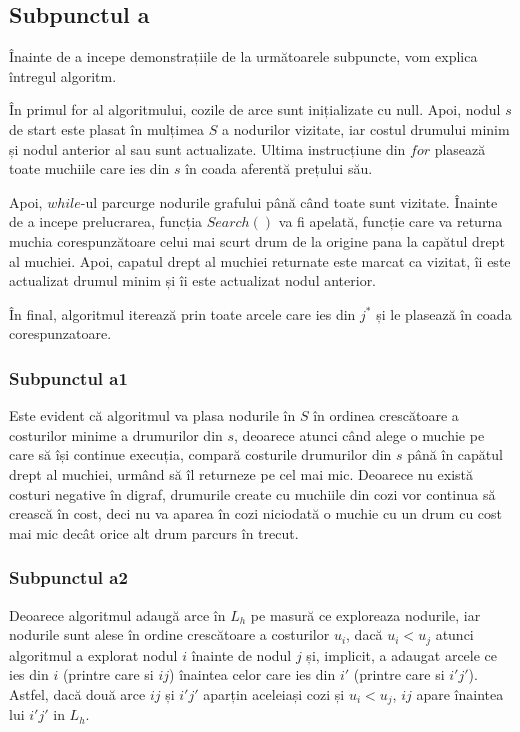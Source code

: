 \documentclass{article}
\begin{document}
\subsection*{\fontsize{16}{30}\selectfont Subpunctul a}
{\fontsize{14}{16}\selectfont
Înainte de a incepe demonstrațiile de la următoarele subpuncte, vom explica întregul algoritm.

În primul for al algoritmului, cozile de arce sunt inițializate cu null.
Apoi, nodul $s$ de start este plasat în mulțimea $S$ a nodurilor vizitate, iar costul drumului minim și nodul anterior al sau sunt actualizate. Ultima instrucțiune din $for$ plasează toate muchiile care ies din $s$ în coada aferentă prețului său.

Apoi, $while$-ul parcurge nodurile grafului până când toate sunt vizitate. Înainte de a incepe prelucrarea, funcția $Search()$ va fi apelată, funcție care va returna muchia corespunzătoare celui mai scurt drum de la origine pana la capătul drept al muchiei. Apoi, capatul drept al muchiei returnate este marcat ca vizitat, îi este actualizat drumul minim și îi este actualizat nodul anterior. 

În final, algoritmul iterează prin toate arcele care ies din $j^*$ și le plasează în coada corespunzatoare.
}
\subsubsection*{\fontsize{14}{20}\selectfont Subpunctul a1}
{\fontsize{14}{16}\selectfont
Este evident că algoritmul va plasa nodurile în $S$ în ordinea crescătoare a costurilor minime a drumurilor din $s$, deoarece atunci când alege o muchie pe care să își continue execuția, compară costurile drumurilor din $s$ până în capătul drept al muchiei, urmând să îl returneze pe cel mai mic. Deoarece nu există costuri negative în digraf, drumurile create cu muchiile din cozi vor continua să crească în cost, deci nu va aparea în cozi niciodată o muchie cu un drum cu cost mai mic decât orice alt drum parcurs în trecut.
}

\subsubsection*{\fontsize{14}{20}\selectfont Subpunctul a2}
{\fontsize{14}{16}\selectfont

Deoarece algoritmul adaugă arce în $L_h$ pe masură ce exploreaza nodurile, iar nodurile sunt alese în ordine crescătoare a costurilor $u_i$, dacă $u_i < u_j$ atunci algoritmul a explorat nodul $i$ înainte de nodul $j$ și, implicit, a adaugat arcele ce ies din $i$ (printre care si $ij$) înaintea celor care ies din $i'$ (printre care si $i'j'$). Astfel, dacă două arce $ij$ și $i'j'$ aparțin aceleiași cozi și $u_i < u_j$, $ij$ apare înaintea lui $i'j'$ in $L_h$.

}
\end{document}
